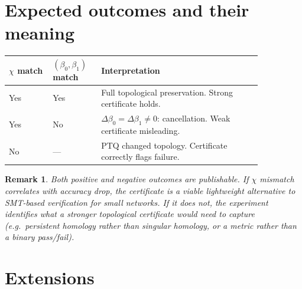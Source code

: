 \documentclass[11pt]{article}
\newtheorem{remark}{Remark}
\begin{document}
\section{Expected outcomes and their meaning}

\begin{center}
\begin{tabular}{p{0.15\linewidth}p{0.15\linewidth}p{0.55\linewidth}}
\toprule
$\chi$ match & $(\beta_0,\beta_1)$ match & Interpretation \\
\midrule
Yes & Yes & Full topological preservation. Strong certificate holds. \\
Yes & No  & $\Delta\beta_0 = \Delta\beta_1 \neq 0$: cancellation. Weak certificate misleading. \\
No  & ---  & PTQ changed topology. Certificate correctly flags failure. \\
\bottomrule
\end{tabular}
\end{center}

\begin{remark}
Both positive and negative outcomes are publishable. If $\chi$ mismatch correlates
with accuracy drop, the certificate is a viable lightweight alternative to SMT-based
verification for small networks. If it does not, the experiment identifies what a
stronger topological certificate would need to capture (e.g.\ persistent homology
rather than singular homology, or a metric rather than a binary pass/fail).
\end{remark}

\section{Extensions}
\end{document}
